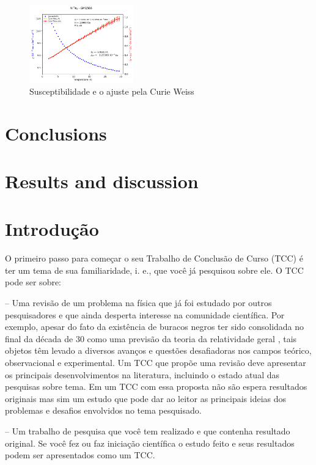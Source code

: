 \documentclass[prd,amsfonts,onecolumn,superscriptaddress,aps,nofootinbib,11pt]{revtex4}
\begin{document}
\begin{figure}[H]
    \centering
    \includegraphics[width=0.4\textwidth]{results/GMQ586-chi-curieweiss.png}
    \caption{Susceptibilidade e o ajuste pela Curie Weiss}
    \label{fig:suscep}
\end{figure}




\section{Conclusions }
\label{sec:conclu}
\section{Results and discussion}\label{sec:resultados}
\newpage


\appendix


\section{Introdução} 


O primeiro passo para começar o seu Trabalho de Conclusão de Curso (TCC) é ter um tema de sua familiaridade, i. e., que você já pesquisou sobre ele. O TCC pode ser sobre: 

-- Uma revisão de um problema na física que já foi estudado por outros pesquisadores e que 
ainda desperta interesse na comunidade científica. 
Por exemplo, apesar do fato da existência de buracos negros ter sido consolidada  
no final da  década de 30 como uma previsão da teoria da relatividade geral ,  tais objetos têm levado a diversos avanços e questões 
desafiadoras nos campos teórico, observacional e experimental. Um TCC que propõe uma revisão 
deve apresentar os principais desenvolvimentos na literatura, incluindo  
o estado atual das pesquisas sobre tema. Em um TCC com essa proposta não são espera resultados 
originais mas sim um estudo que pode dar ao leitor as principais ideias dos problemas e desafios 
envolvidos no tema pesquisado. 

-- Um trabalho de pesquisa que você tem realizado e que contenha resultado original. Se você 
fez ou faz iniciação científica o estudo feito e seus resultados podem ser apresentados como 
um TCC. 
\end{document}
